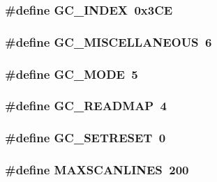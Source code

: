 \hypertarget{ID__VL_8H_a376104a1140e2eb1682b8e6bfbc6baa5}{
\subsubsection[{GC\_\-INDEX}]{\setlength{\rightskip}{0pt plus 5cm}\#define GC\_\-INDEX~0x3CE}}
\label{ID__VL_8H_a376104a1140e2eb1682b8e6bfbc6baa5}
\hypertarget{ID__VL_8H_a84cfbb7767b3a4161050e2f1c9ec4f9c}{
\subsubsection[{GC\_\-MISCELLANEOUS}]{\setlength{\rightskip}{0pt plus 5cm}\#define GC\_\-MISCELLANEOUS~6}}
\label{ID__VL_8H_a84cfbb7767b3a4161050e2f1c9ec4f9c}
\hypertarget{ID__VL_8H_a905ca51e0e01d01c850b6200148f99d8}{
\subsubsection[{GC\_\-MODE}]{\setlength{\rightskip}{0pt plus 5cm}\#define GC\_\-MODE~5}}
\label{ID__VL_8H_a905ca51e0e01d01c850b6200148f99d8}
\hypertarget{ID__VL_8H_a05e0548234030cf1bd7853ebb5329b68}{
\subsubsection[{GC\_\-READMAP}]{\setlength{\rightskip}{0pt plus 5cm}\#define GC\_\-READMAP~4}}
\label{ID__VL_8H_a05e0548234030cf1bd7853ebb5329b68}
\hypertarget{ID__VL_8H_a178dd2b3dcf605e3533114bc61be3278}{
\subsubsection[{GC\_\-SETRESET}]{\setlength{\rightskip}{0pt plus 5cm}\#define GC\_\-SETRESET~0}}
\label{ID__VL_8H_a178dd2b3dcf605e3533114bc61be3278}
\hypertarget{ID__VL_8H_ae8d720565cd28cc36ed5b5ecd8b12385}{
\subsubsection[{MAXSCANLINES}]{\setlength{\rightskip}{0pt plus 5cm}\#define MAXSCANLINES~200}}
